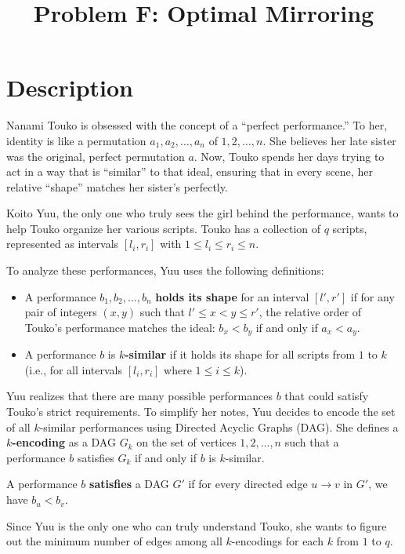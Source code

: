 \documentclass[11pt]{article}
\title{\textbf{Problem F: Optimal Mirroring}}
\date{}
\author{}
\begin{document}
\maketitle

\section*{Description}

Nanami Touko is obsessed with the concept of a ``perfect performance.'' To her, identity is like a permutation $a_1, a_2, \dots, a_n$ of $1, 2, \dots, n$. She believes her late sister was the original, perfect permutation $a$. Now, Touko spends her days trying to act in a way that is ``similar'' to that ideal, ensuring that in every scene, her relative ``shape'' matches her sister's perfectly.

Koito Yuu, the only one who truly sees the girl behind the performance, wants to help Touko organize her various scripts. Touko has a collection of $q$ scripts, represented as intervals $[l_i, r_i]$ with $1 \le l_i \le r_i \le n$.

To analyze these performances, Yuu uses the following definitions:

\begin{itemize}
    \item A performance $b_1, b_2, \dots, b_n$ \textbf{holds its shape} for an interval $[l', r']$ if for any pair of integers $(x, y)$ such that $l' \le x < y \le r'$, the relative order of Touko's performance matches the ideal: $b_x < b_y$ if and only if $a_x < a_y$.
    \item A performance $b$ is \textbf{$k$-similar} if it holds its shape for all scripts from $1$ to $k$ (i.e., for all intervals $[l_i, r_i]$ where $1 \le i \le k$).
\end{itemize}

Yuu realizes that there are many possible performances $b$ that could satisfy Touko's strict requirements. To simplify her notes, Yuu decides to encode the set of all $k$-similar performances using Directed Acyclic Graphs (DAG). She defines a \textbf{$k$-encoding} as a DAG $G_k$ on the set of vertices $1, 2, \dots, n$ such that a performance $b$ satisfies $G_k$ if and only if $b$ is $k$-similar.

A performance $b$ \textbf{satisfies} a DAG $G'$ if for every directed edge $u \to v$ in $G'$, we have $b_u < b_v$.

Since Yuu is the only one who can truly understand Touko, she wants to figure out the minimum number of edges among all $k$-encodings for each $k$ from $1$ to $q$.
\end{document}

